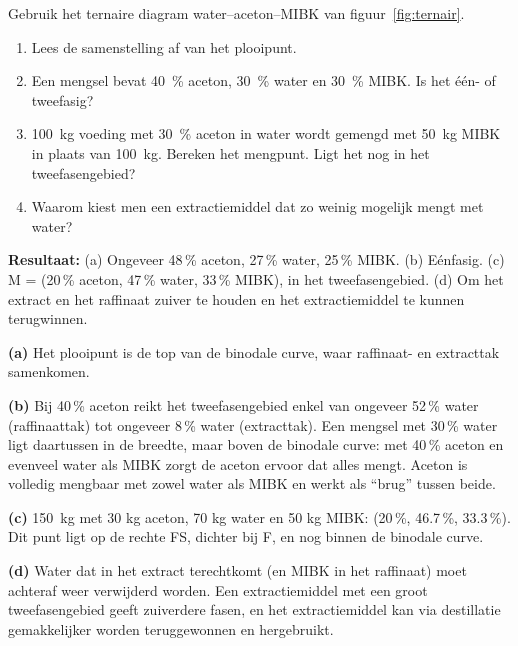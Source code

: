 \begin{oefening}
Gebruik het ternaire diagram water--aceton--MIBK van figuur~\ref{fig:ternair}.
\begin{enumerate}
\item[(a)] Lees de samenstelling af van het plooipunt.
\item[(b)] Een mengsel bevat \SI{40}{\percent} aceton, \SI{30}{\percent} water en \SI{30}{\percent} MIBK. Is het \'e\'en- of tweefasig?
\item[(c)] \SI{100}{\kilo\gram} voeding met \SI{30}{\percent} aceton in water wordt gemengd met \SI{50}{\kilo\gram} MIBK in plaats van \SI{100}{\kilo\gram}. Bereken het mengpunt. Ligt het nog in het tweefasengebied?
\item[(d)] Waarom kiest men een extractiemiddel dat zo weinig mogelijk mengt met water?
\end{enumerate}
\end{oefening}
\begin{oplossing}
\textbf{Resultaat:} (a) Ongeveer 48\,\% aceton, 27\,\% water, 25\,\% MIBK. (b) E\'enfasig. (c) M = (20\,\% aceton, 47\,\% water, 33\,\% MIBK), in het tweefasengebied. (d) Om het extract en het raffinaat zuiver te houden en het extractiemiddel te kunnen terugwinnen.

\textbf{(a)} Het plooipunt is de top van de binodale curve, waar raffinaat- en extracttak samenkomen.

\textbf{(b)} Bij 40\,\% aceton reikt het tweefasengebied enkel van ongeveer 52\,\% water (raffinaattak) tot ongeveer 8\,\% water (extracttak). Een mengsel met 30\,\% water ligt daartussen in de breedte, maar boven de binodale curve: met 40\,\% aceton en evenveel water als MIBK zorgt de aceton ervoor dat alles mengt. Aceton is volledig mengbaar met zowel water als MIBK en werkt als ``brug'' tussen beide.

\textbf{(c)} \SI{150}{\kilo\gram} met 30 kg aceton, 70 kg water en 50 kg MIBK: (20\,\%, 46.7\,\%, 33.3\,\%). Dit punt ligt op de rechte FS, dichter bij F, en nog binnen de binodale curve.

\textbf{(d)} Water dat in het extract terechtkomt (en MIBK in het raffinaat) moet achteraf weer verwijderd worden. Een extractiemiddel met een groot tweefasengebied geeft zuiverdere fasen, en het extractiemiddel kan via destillatie gemakkelijker worden teruggewonnen en hergebruikt.
\end{oplossing}
